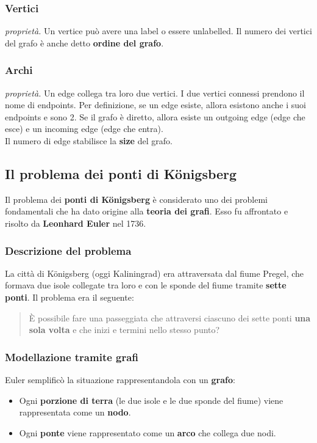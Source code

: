 \subsubsection*{Vertici}

\textit{proprietà.} Un vertice può avere una label o essere unlabelled. Il numero dei vertici del grafo è anche detto \textbf{ordine del grafo}. 

\subsubsection*{Archi}

\textit{proprietà.} Un edge collega tra loro due vertici. I due vertici connessi prendono il nome di endpoints. Per definizione, se un edge esiste, allora esistono anche i suoi endpoints e sono 2. Se il grafo è diretto, allora esiste un outgoing edge (edge che esce) e un incoming edge (edge che entra).
\\
Il numero di edge stabilisce la \textbf{size} del grafo.
\newpage
\subsection{Il problema dei ponti di Königsberg}

Il problema dei \textbf{ponti di Königsberg} è considerato uno dei problemi fondamentali che ha dato origine alla \textbf{teoria dei grafi}. Esso fu affrontato e risolto da \textbf{Leonhard Euler} nel 1736.

\subsubsection*{Descrizione del problema}

La città di Königsberg (oggi Kaliningrad) era attraversata dal fiume Pregel, che formava due isole collegate tra loro e con le sponde del fiume tramite \textbf{sette ponti}. Il problema era il seguente:

\begin{quote}
    È possibile fare una passeggiata che attraversi ciascuno dei sette ponti \textbf{una sola volta} e che inizi e termini nello stesso punto?
\end{quote}

\subsubsection*{Modellazione tramite grafi}

Euler semplificò la situazione rappresentandola con un \textbf{grafo}:
\begin{itemize}
    \item Ogni \textbf{porzione di terra} (le due isole e le due sponde del fiume) viene rappresentata come un \textbf{nodo}.
    \item Ogni \textbf{ponte} viene rappresentato come un \textbf{arco} che collega due nodi.
\end{itemize}

